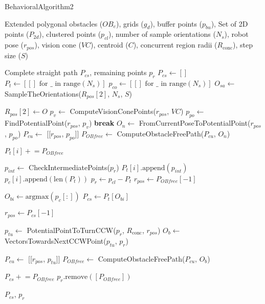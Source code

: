 \begin{algorithm}[H]
    \caption{BehavioralAlgorithm2}
    \label{alg:behavioral_algorithm_2}
    \begin{algorithmic}[1]

    \Require Extended polygonal obstacles ($OB_e$), grids ($g_d$), buffer points ($p_{bu}$), Set of 2D points ($P_{2d}$), clustered points ($p_{cl}$), number of sample orientations ($N_s$), robot pose ($r_{pos}$), vision cone ($VC$), centroid ($C$), concurrent region radii ($R_{\text{conc}}$), step size ($S$)

    \Ensure Complete straight path $P_{cs}$, remaining points $p_r$
    \State $P_{cs} \leftarrow []$
    \State $P_t \leftarrow [[] \text{ for } \_ \text{ in range}(N_s)]$
    \State $p_{co} \leftarrow [[] \text{ for } \_ \text{ in range}(N_s)]$
    \State $O_{sa} \leftarrow$ SampleTheOrientations($R_{pos}[2]$, $N_s$, $S$)
    
        \State $R_{pos}[2] \leftarrow O$
            \State $p_v \leftarrow$ ComputeVisionConePoints($r_{pos}$, $VC$)
            \State $p_{po} \leftarrow$ FindPotentialPoint($r_{pos}$, $p_v$)
                \State \textbf{break}
            \EndIf
            \State $O_n \leftarrow$ FromCurrentPoseToPotentialPoint($r_{pos}$, $p_{po}$)
            \State $P_{cu} \leftarrow$ [[$r_{pos}$, $p_{po}$]]
            \State $P_{OB free} \leftarrow$ ComputeObstacleFreePath($P_{cu}$, $O_n$)


            \State $P_t[i] \mathrel{+}= P_{OB free}$
            
            \State $p_{int} \leftarrow$ CheckIntermediatePoints($p_r$)
            \State $P_t[i].\text{append}(p_{int})$
            \State $p_c[i].\text{append}(\text{len}(P_t))$
            \State $p_r \leftarrow p_{cl} - P_t$
            \State $r_{pos} \leftarrow P_{OB free}[-1]$
        \EndWhile
    \EndFor
    
    \State $O_{bi} \leftarrow \text{argmax}(p_c[:])$
    \State $P_{cs} \leftarrow P_t[O_{bi}]$
    
    \State $r_{pos} \leftarrow P_{cs}[-1]$

    \State $p_{tu} \leftarrow$ PotentialPointToTurnCCW($p_r$, $R_{\text{conc}}$, $r_{pos}$)
    \State $O_b \leftarrow$ VectorsTowardsNextCCWPoint($p_{tu}$, $p_r$)


    \State $P_{cu} \leftarrow$ [[$r_{pos}$, $p_{tu}$]]
    \State $P_{OB free} \leftarrow$ ComputeObstacleFreePath($P_{cu}$, $O_b$)

    \State $P_{cs} \mathrel{+}= P_{OB free}$
    \State $p_r.\text{remove}([P_{OB free}])$ 
    
    \State \Return $P_{cs}$, $p_r$
    \end{algorithmic}
    \end{algorithm}



